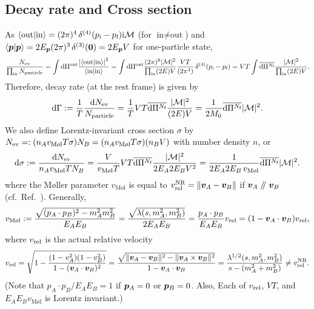 \documentclass[CheatSheet]{subfiles}
\begin{document}
\subsection{Decay rate and Cross section}
As
$\braket{\text{out}|\text{in}}=(2\pi)^4\diracdelta[4](p\w i-p\w f)\ii\mathcal M$
(for $\text{in}\neq\text{out}$) and $\braket{\vc p|\vc p}=2E_{\vc p}(2\pi)^3\diracdelta[3](\vc 0)=2E_\vc {p}V$ for one-particle state,
\begin{equation}
 \frac{N\w{ev}}{\prod\w{in} N\w{particle}}
= \int\dd\Pi^{\mathrm{out}}\frac{\left|\braket{\text{out}|\text{in}}\right|^2}{\braket{\text{in}|\text{in}}}
= \int\dd\Pi^{\mathrm{out}}\frac{(2\pi)^8|\mathcal M|^2}{\prod\w{in}(2E)V}
\frac{VT}{(2\pi^4)}\diracdelta[4](p\w i-p\w f)
= VT\int\overline{\dd\Pi^{N\w f}}\frac{|\mathcal M|^2}{\prod\w{in}(2E)V}.
\end{equation}
Therefore, decay rate (at the rest frame) is given by
\begin{equation}
 \mathop{}\!\mathrm{d}\Gamma
:= \frac{1}{T}\frac{\mathop{}\!\mathrm{d} N_{\text{ev}}}{N_{\text{particle}}}
 = \frac{1}{T}VT\overline{\mathop{}\!\mathrm{d}\Pi^{N_{\text{f}}}}\frac{|\mathcal M|^2}{(2E)V}
 = \frac{1}{2M_0}\overline{\mathop{}\!\mathrm{d}\Pi^{N_{\text{f}}}}{|\mathcal M|^2}.
\end{equation}
We also define Lorentz-invariant cross section $\sigma$ by $N\w{ev}=:(n_A v_{\text{M\o l}}T\sigma)N_B=(n_A v_{\text{M\o l}}T\sigma)(n_B V)$ with
number density $n$, or
\begin{equation}
\dd\sigma:=\frac{\dd N\w{ev}}{n_A v_{\text{M\o l}}TN_B}
=
\frac{V}{v_{\text{M\o l}}T}
VT\overline{\dd\Pi^{N\w f}}\frac{|\mathcal M|^2}{2E_A2E_BV^2}
=
\frac{1}{2E_A2E_B\,v_{\text{M\o l}}}
\overline{\dd\Pi^{N\w f}}|\mathcal M|^2.
\end{equation}
where the M\o ller parameter $v_{\text{M\o l}}$ is equal to $v^{\mathrm{NR}}_{\text{rel}}=\|{\boldsymbol{v}}_A-{\boldsymbol{v}}_B\|$ if ${\boldsymbol{v}}_A\mathrel{/\mkern-5mu/}{\boldsymbol{v}}_B$ (cf.~Ref.~\cite{Cannoni:2016hro}).
Generally,
\begin{equation}
  v_{\text{M\o l}}:=
 \frac{\sqrt{(p_A\cdot p_B)^2-m_A^2m_B^2}}{E_AE_B}
=\frac{\sqrt{\Kallen(s,m_A^2,m_B^2)}}{2E_AE_B}
=\frac{p_A\cdot p_B}{E_A E_B}v\w{rel}
=({1-\vc v_A\cdot\vc v_B})v\w{rel},
\end{equation}
where $v_{\text{rel}}$ is the actual relative velocity
\begin{equation}
  v\w{rel}
=\sqrt{1-\frac{(1-v_A^2)(1-v_B^2)}{1-(\vc v_A\cdot\vc v_B)^2}}
=\frac{\sqrt{\|\vc v_A-\vc v_B\|^2-\|\vc v_A\times\vc v_B\|^2}}{1-\vc v_A\cdot\vc v_B}
=\frac{\Kallen[1/2](s,m_A^2,m_B^2)}{s-(m_A^2+m_B^2)}\neq v^{\mathrm{NR}}\w{rel}.
\end{equation}
(Note that $p_A\cdot p_B/E_AE_B=1$ if ${\boldsymbol{p}}_A=0$ or ${\boldsymbol{p}}_B=0$. Also, Each of $v_{\text{rel}}$, $VT$, and $E_AE_Bv_{\text{M\o l}}$ is Lorentz invariant.)
\end{document}
